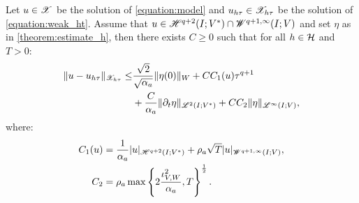 \begin{theorem} \label{theorem:estimate_ht}
    Let $u \in \mathscr{X}$ be the solution of \eqref{equation:model} and $u_{h \tau} \in \mathscr{X}_{h \tau}$ be the solution of \eqref{equation:weak_ht}. Assume that $u \in \mathscr{H}^{q + 2}(I; V^*) \cap \mathscr{W}^{q + 1, \infty}(I; V)$ and set $\eta$ as in \autoref{theorem:estimate_h}, then there exists $C \geq 0$ such that for all $h \in \mathcal{H}$ and $T > 0$:
    \begin{align}
        \lVert u - u_{h \tau} \rVert_{\mathscr{X}_{h \tau}} \leq & \frac{\sqrt{2}}{\sqrt{\alpha_{a}}} \lVert \eta(0) \rVert_W + C C_1(u) \tau^{q + 1} \\
        & + \frac{C}{\alpha_{a}} \lVert \partial_t \eta \rVert_{\mathscr{L}^{2}(I; V^*)} + C C_2 \lVert \eta \rVert_{\mathscr{L}^{\infty}(I; V)}, \notag
    \end{align}
    where:
    \begin{align}
        C_1(u) & = \frac{1}{\alpha_{a}} \lvert u \rvert_{\mathscr{H}^{q + 2}(I; V^*)} + \rho_{a} \sqrt{T} \lvert u \rvert_{\mathscr{W}^{q + 1, \infty}(I; V)}, \\
        C_2 & = \rho_{a} \max \left\{ 2 \frac{\iota_{V, W}^2}{\alpha_{a}}, T \right\}^{\frac{1}{2}}.
    \end{align}
\end{theorem}